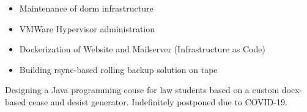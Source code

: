 \documentclass[10pt,a4paper,ragged2e,withhyper]{altacv}
\begin{document}
\begin{paracol}{2}
\divider


\medskip
\begin{itemize}
\item Maintenance of dorm infrastructure
\item VMWare Hypervisor administration
\item Dockerization of Website and Mailserver (Infrastructure as Code)
\item Building rsync-based rolling backup solution on tape
\end{itemize}

\divider 

\medskip
Designing a Java programming couse for law students based on a custom docx-based cease and desist generator. Indefinitely postponed due to COVID-19.

\end{paracol}
\end{document}
